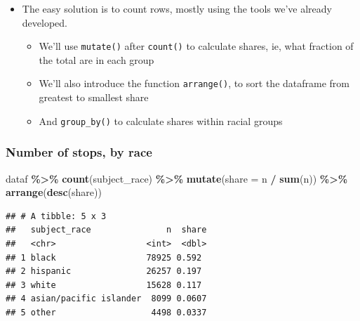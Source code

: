 \documentclass[
]{article}
\newenvironment{Shaded}{\begin{snugshade}}{\end{snugshade}}
\newcommand{\DataTypeTok}[1]{\textcolor[rgb]{0.13,0.29,0.53}{#1}}
\newcommand{\KeywordTok}[1]{\textcolor[rgb]{0.13,0.29,0.53}{\textbf{#1}}}
\newcommand{\NormalTok}[1]{#1}
\newcommand{\OperatorTok}[1]{\textcolor[rgb]{0.81,0.36,0.00}{\textbf{#1}}}
\newcommand{\StringTok}[1]{\textcolor[rgb]{0.31,0.60,0.02}{#1}}
\providecommand{\tightlist}{%
  \setlength{\itemsep}{0pt}\setlength{\parskip}{0pt}}
\begin{document}
\begin{itemize}
\tightlist
\item
  The easy solution is to count rows, mostly using the tools we've already developed.

  \begin{itemize}
  \tightlist
  \item
    We'll use \texttt{mutate()} after \texttt{count()} to calculate shares, ie, what fraction of the total are in each group
  \item
    We'll also introduce the function \texttt{arrange()}, to sort the dataframe from greatest to smallest share
  \item
    And \texttt{group\_by()} to calculate shares within racial groups
  \end{itemize}
\end{itemize}

\hypertarget{number-of-stops-by-race}{%
\subsubsection{Number of stops, by race}\label{number-of-stops-by-race}}

\begin{Shaded}
\begin{Highlighting}[]
\NormalTok{dataf }\OperatorTok{\%\textgreater{}\%}\StringTok{ }
\StringTok{    }\KeywordTok{count}\NormalTok{(subject\_race) }\OperatorTok{\%\textgreater{}\%}\StringTok{ }
\StringTok{    }\KeywordTok{mutate}\NormalTok{(}\DataTypeTok{share =}\NormalTok{ n }\OperatorTok{/}\StringTok{ }\KeywordTok{sum}\NormalTok{(n)) }\OperatorTok{\%\textgreater{}\%}\StringTok{ }
\StringTok{    }\KeywordTok{arrange}\NormalTok{(}\KeywordTok{desc}\NormalTok{(share))}
\end{Highlighting}
\end{Shaded}

\begin{verbatim}
## # A tibble: 5 x 3
##   subject_race               n  share
##   <chr>                  <int>  <dbl>
## 1 black                  78925 0.592 
## 2 hispanic               26257 0.197 
## 3 white                  15628 0.117 
## 4 asian/pacific islander  8099 0.0607
## 5 other                   4498 0.0337
\end{verbatim}
\end{document}
